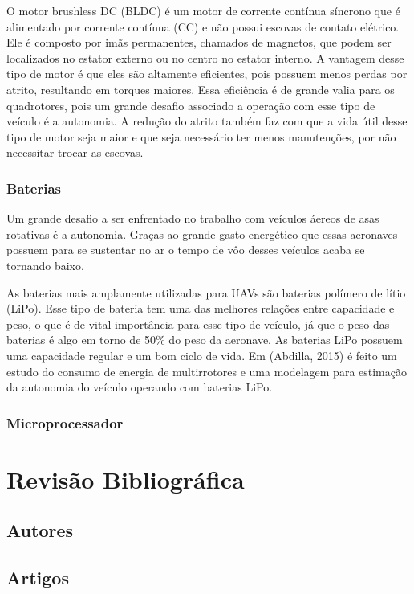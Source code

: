 O motor brushless DC (BLDC) é um motor de corrente contínua síncrono que é alimentado por corrente contínua (CC) e não possui escovas de contato elétrico. Ele é composto por imãs permanentes, chamados de magnetos, que podem ser localizados no estator externo ou no centro no estator interno. A vantagem desse tipo de motor é que eles são altamente eficientes, pois possuem menos perdas por atrito, resultando em torques maiores. Essa eficiência é de grande valia para os quadrotores, pois um grande desafio associado a operação com esse tipo de veículo é a autonomia. A redução do atrito também faz com que a vida útil desse tipo de motor seja maior e que seja necessário ter menos manutenções, por não necessitar trocar as escovas.

\subsubsection{Baterias}

Um grande desafio a ser enfrentado no trabalho com veículos áereos de asas rotativas é a autonomia. Graças ao grande gasto energético que essas aeronaves possuem para se sustentar no ar o tempo de vôo desses veículos acaba se tornando baixo.   

As baterias mais amplamente utilizadas para UAVs são baterias polímero de lítio (LiPo). Esse tipo de bateria tem uma das melhores relações entre capacidade e peso, o que é de vital importância para esse tipo de veículo, já que o peso das baterias é algo em torno de 50\% do peso da aeronave. As baterias LiPo possuem uma capacidade regular e um bom ciclo de vida. Em (Abdilla, 2015) é feito um estudo do consumo de energia de multirrotores e uma modelagem para estimação da autonomia do veículo operando com baterias LiPo.  

\subsubsection{Microprocessador}

\section{Revisão Bibliográfica}
\subsection{Autores}
\subsection{Artigos}

